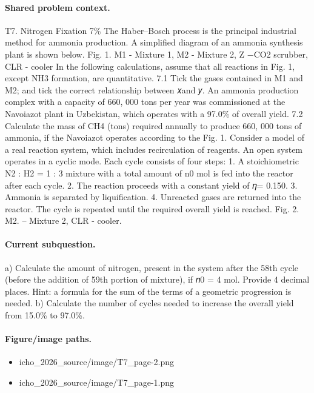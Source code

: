 \paragraph{Shared problem context.}
T7. Nitrogen Fixation 7\% The Haber–Bosch process is the principal industrial method for ammonia production. A simplified diagram of an ammonia synthesis plant is shown below. Fig. 1. M1 - Mixture 1, M2 - Mixture 2, Z −CO2 scrubber, CLR - cooler In the following calculations, assume that all reactions in Fig. 1, except NH3 formation, are quantitative. 7.1 Tick the gases contained in M1 and M2; and tick the correct relationship between 𝑥and 𝑦. An ammonia production complex with a capacity of 660, 000 tons per year was commissioned at the Navoiazot plant in Uzbekistan, which operates with a 97.0\% of overall yield. 7.2 Calculate the mass of CH4 (tons) required annually to produce 660, 000 tons of ammonia, if the Navoiazot operates according to the Fig. 1. Consider a model of a real reaction system, which includes recirculation of reagents. An open system operates in a cyclic mode. Each cycle consists of four steps: 1. A stoichiometric N2 : H2 = 1 : 3 mixture with a total amount of n0 mol is fed into the reactor after each cycle. 2. The reaction proceeds with a constant yield of 𝜂= 0.150. 3. Ammonia is separated by liquification. 4. Unreacted gases are returned into the reactor. The cycle is repeated until the required overall yield is reached. Fig. 2. M2. – Mixture 2, CLR - cooler.

\paragraph{Current subquestion.}
a) Calculate the amount of nitrogen, present in the system after the 58th cycle (before the addition of 59th portion of mixture), if 𝑛0 = 4 mol. Provide 4 decimal places. Hint: a formula for the sum of the terms of a geometric progression is needed. b) Calculate the number of cycles needed to increase the overall yield from 15.0\% to 97.0\%.

\paragraph{Figure/image paths.}
\begin{itemize}
\item icho\_2026\_source/image/T7\_page-2.png
\item icho\_2026\_source/image/T7\_page-1.png
\end{itemize}

